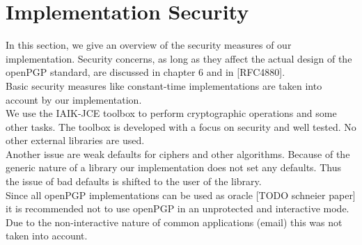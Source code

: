 %
%
%
%
%
%

\section{Implementation Security}
In this section, we give an overview of the security measures of our implementation. 
Security concerns, as long as they affect the actual design of the openPGP standard, are discussed in chapter 6 and in [RFC4880].  \\

Basic security measures like constant-time implementations are taken into account by our implementation.  \\

We use the IAIK-JCE toolbox to perform cryptographic operations and some other tasks. The toolbox is developed with a focus on security and well tested. No other external libraries are used. \\

Another issue are weak defaults for ciphers and other algorithms. Because of the generic nature of a library our implementation does not set any defaults. Thus the issue of bad defaults is shifted to the user of the library. \\

Since all openPGP implementations can be used as oracle [TODO schneier paper] it is recommended not to use openPGP in an unprotected and interactive mode. Due to the non-interactive nature of common applications (email) this was not taken into account.






